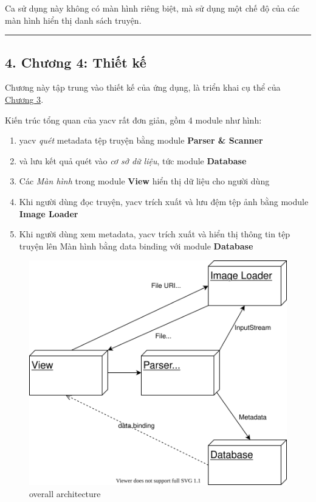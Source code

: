 \documentclass[
]{article}
\begin{document}
Ca sử dụng này không có màn hình riêng biệt, mà sử dụng một chế độ của
các màn hình hiển thị danh sách truyện.

\begin{center}\rule{0.5\linewidth}{0.5pt}\end{center}

\hypertarget{chux1b0ux1a1ng-4-thiux1ebft-kux1ebf}{%
\subsection{\texorpdfstring{4. Chương 4: Thiết kế
}{4. Chương 4: Thiết kế }}\label{chux1b0ux1a1ng-4-thiux1ebft-kux1ebf}}

Chương này tập trung vào thiết kế của ứng dụng, là triển khai cụ thể của
\protect\hyperlink{P3-specification}{Chương 3}.

Kiến trúc tổng quan của yacv rất đơn giản, gồm 4 module như hình:

\begin{enumerate}
\def\labelenumi{\arabic{enumi}.}
\item
  yacv \emph{quét} metadata tệp truyện bằng module \textbf{Parser \&
  Scanner}
\item
  và lưu kết quả quét vào \emph{cơ sở dữ liệu}, tức module
  \textbf{Database}
\item
  Các \emph{Màn hình} trong module \textbf{View} hiển thị dữ liệu cho
  người dùng
\item
  Khi người dùng đọc truyện, yacv trích xuất và lưu đệm tệp ảnh bằng
  module \textbf{Image Loader}
\item
  Khi người dùng xem metadata, yacv trích xuất và hiển thị thông tin tệp
  truyện lên Màn hình bằng data binding với module \textbf{Database}
\end{enumerate}

\begin{figure}
\centering
\includegraphics{../images/overall_architecture.svg}
\caption{overall architecture}
\end{figure}
\end{document}
